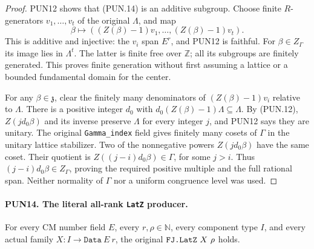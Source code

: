 \documentclass[11pt,a4paper]{article}
\numberwithin{equation}{section}
\theoremstyle{remark}\newtheorem{remark}[theorem]{Remark}
\begin{document}
\begin{proof}
PUN12 shows that (PUN.14) is an additive subgroup.  Choose finite
\(R\)-generators \(v_1,\ldots,v_t\) of the original
\(\Lambda\), and map
\[
 \beta\longmapsto
        ((Z(\beta)-1)v_1,\ldots,(Z(\beta)-1)v_t).
 \tag{PUN.15}
\]
This is additive and injective: the \(v_i\) span \(E^r\),
and PUN12 is faithful.  For \(\beta\in Z_\Gamma\) its
image lies in \(\Lambda^t\).  The latter is finite free over
\(\mathbb Z\); all its subgroups are finitely generated.
This proves finite generation without first assuming a lattice
or a bounded fundamental domain for the center.

For any \(\beta\in\mathfrak z\), clear the finitely many
denominators of \((Z(\beta)-1)v_i\) relative to \(\Lambda\).
There is a positive integer \(d_0\) with
\(d_0(Z(\beta)-1)\Lambda\subseteq\Lambda\).
By (PUN.12), \(Z(jd_0\beta)\) and its inverse preserve
\(\Lambda\) for every integer \(j\), and PUN12 says they
are unitary.  The original \texttt{Gamma\_\allowbreak index} field gives
finitely many cosets of \(\Gamma\) in the unitary lattice
stabilizer.  Two of the nonnegative powers
\(Z(jd_0\beta)\) have the same coset.  Their quotient is
\(Z((j-i)d_0\beta)\in\Gamma\), for some \(j>i\).
Thus \((j-i)d_0\beta\in Z_\Gamma\), proving the required
positive multiple and the full rational span.  Neither normality
of \(\Gamma\) nor a uniform congruence level was used.
\end{proof}

\paragraph{PUN14. The literal all-rank \texttt{Lat\allowbreak Z} producer.}
\label{claim:PUN14}
For every CM number field \(E\), every \(r,\rho\in\mathbb N\),
every component type \(I\), and every actual family
\(X:I\to\texttt{Data}\ E\ r\), the original
\(\texttt{FJ.\allowbreak Lat\allowbreak Z}\ X\ \rho\) holds.
\end{document}

